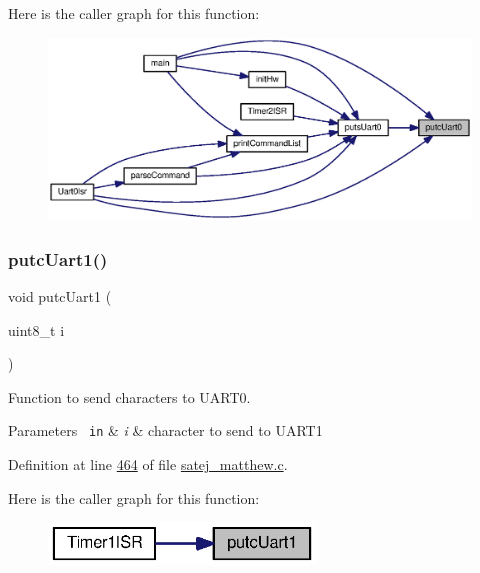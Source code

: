 Here is the caller graph for this function\+:\nopagebreak
\begin{figure}[H]
\begin{center}
\leavevmode
\includegraphics[width=350pt]{satej__matthew_8c_a27ebab6950bfb65d641dd04feb03906f_icgraph}
\end{center}
\end{figure}
\mbox{\label{satej__matthew_8c_a6c61bcdd147e256a7e6b05b34fb783bc}} 
\subsubsection{\texorpdfstring{putcUart1()}{putcUart1()}}
{\footnotesize\ttfamily void putc\+Uart1 (\begin{DoxyParamCaption}\item[{uint8\+\_\+t}]{i }\end{DoxyParamCaption})}



Function to send characters to U\+A\+R\+T0. 


\begin{DoxyParams}[1]{Parameters}
\mbox{\texttt{ in}}  & {\em i} & character to send to U\+A\+R\+T1 \\
\hline
\end{DoxyParams}


Definition at line \mbox{\hyperlink{satej__matthew_8c_source_l00464}{464}} of file \mbox{\hyperlink{satej__matthew_8c_source}{satej\+\_\+matthew.\+c}}.

Here is the caller graph for this function\+:\nopagebreak
\begin{figure}[H]
\begin{center}
\leavevmode
\includegraphics[width=201pt]{satej__matthew_8c_a6c61bcdd147e256a7e6b05b34fb783bc_icgraph}
\end{center}
\end{figure}
\mbox{\label{satej__matthew_8c_af4adb618930ee1a928705aec083cf726}} 
